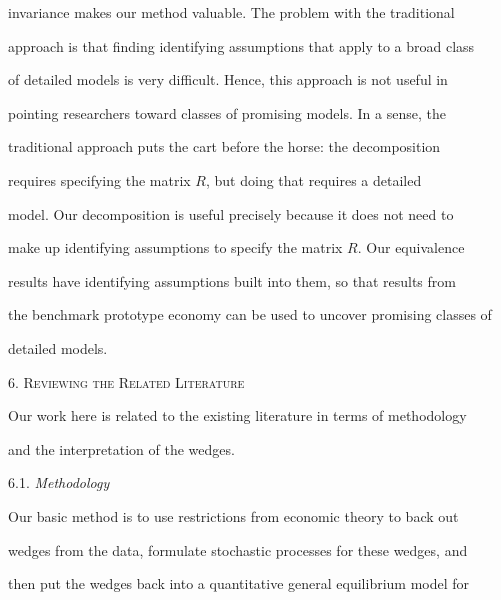 \documentclass[fleqn,leqno,11pt]{article}
\begin{document}
invariance makes our method valuable. The problem with the traditional

approach is that finding identifying assumptions that apply to a broad class

of detailed models is very difficult. Hence, this approach is not useful in

pointing researchers toward classes of promising models. In a sense, the

traditional approach puts the cart before the horse: the decomposition

requires specifying the matrix $R$, but doing that requires a detailed

model. Our decomposition is useful precisely because it does not need to

make up identifying assumptions to specify the matrix $R.$ Our equivalence

results have identifying assumptions built into them, so that results from

the benchmark prototype economy can be used to uncover promising classes of

detailed models.



\bigskip



\begin{center}

6. \textsc{Reviewing the Related Literature}

\end{center}



Our work here is related to the existing literature in terms of methodology

and the interpretation of the wedges.



\bigskip \newpage



\begin{center}

6.1. \emph{Methodology}

\end{center}



Our basic method is to use restrictions from economic theory to back out

wedges from the data, formulate stochastic processes for these wedges, and

then put the wedges back into a quantitative general equilibrium model for
\end{document}
